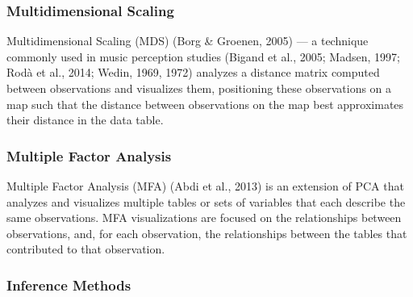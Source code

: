 \documentclass[
  english,
  man,floatsintext]{apa6}
\begin{document}
\hypertarget{multidimensional-scaling}{%
\subsubsection{Multidimensional Scaling}\label{multidimensional-scaling}}

Multidimensional Scaling (MDS) (Borg \& Groenen, 2005) --- a technique commonly used in music perception studies (Bigand et al., 2005; Madsen, 1997; Rodà et al., 2014; Wedin, 1969, 1972) analyzes a distance matrix computed between observations and visualizes them, positioning these observations on a map such that the distance between observations on the map best approximates their distance in the data table.

\hypertarget{multiple-factor-analysis}{%
\subsubsection{Multiple Factor Analysis}\label{multiple-factor-analysis}}

Multiple Factor Analysis (MFA) (Abdi et al., 2013) is an extension of PCA that analyzes and visualizes multiple tables or sets of variables that each describe the same observations. MFA visualizations are focused on the relationships between observations, and, for each observation, the relationships between the tables that contributed to that observation.

\hypertarget{inference-methods}{%
\subsubsection{Inference Methods}\label{inference-methods}}
\end{document}
